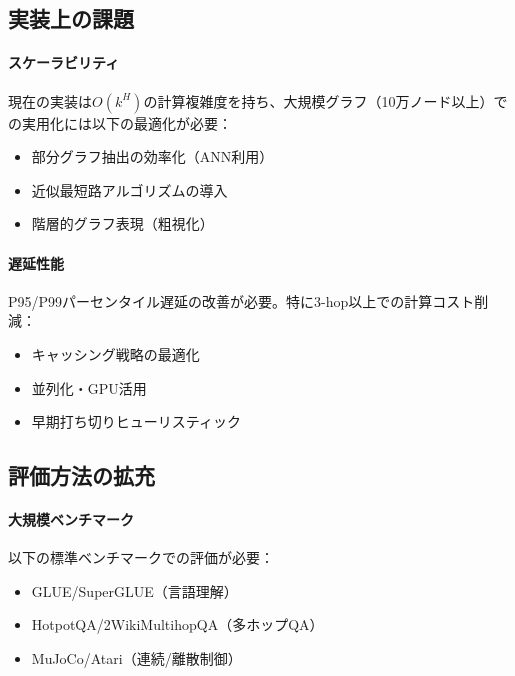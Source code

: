 \documentclass[ja=standard,xelatex]{bxjsarticle}
\begin{document}
\subsection{実装上の課題}

\paragraph{スケーラビリティ}
現在の実装は$O(k^H)$の計算複雑度を持ち、大規模グラフ（10万ノード以上）での実用化には以下の最適化が必要：
\begin{itemize}
  \item 部分グラフ抽出の効率化（ANN利用）
  \item 近似最短路アルゴリズムの導入
  \item 階層的グラフ表現（粗視化）
\end{itemize}

\paragraph{遅延性能}
P95/P99パーセンタイル遅延の改善が必要。特に3-hop以上での計算コスト削減：
\begin{itemize}
  \item キャッシング戦略の最適化
  \item 並列化・GPU活用
  \item 早期打ち切りヒューリスティック
\end{itemize}

\subsection{評価方法の拡充}

\paragraph{大規模ベンチマーク}
以下の標準ベンチマークでの評価が必要：
\begin{itemize}
  \item GLUE/SuperGLUE（言語理解）
  \item HotpotQA/2WikiMultihopQA（多ホップQA）
  \item MuJoCo/Atari（連続/離散制御）
\end{itemize}
\end{document}
